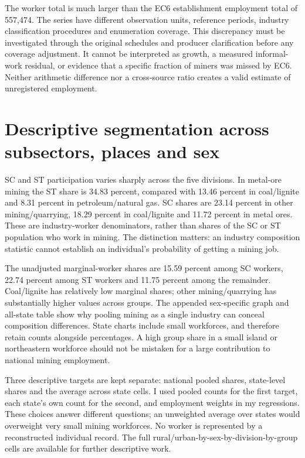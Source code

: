 \documentclass[11pt,a4paper]{report}
\begin{document}
The worker total is much larger than the EC6 establishment employment total of 557,474. The series have different observation units, reference periods, industry classification procedures and enumeration coverage. This discrepancy must be investigated through the original schedules and producer clarification before any coverage adjustment. It cannot be interpreted as growth, a measured informal-work residual, or evidence that a specific fraction of miners was missed by EC6. Neither arithmetic difference nor a cross-source ratio creates a valid estimate of unregistered employment.

\section{Descriptive segmentation across subsectors, places and sex}
SC and ST participation varies sharply across the five divisions. In metal-ore mining the ST share is 34.83 percent, compared with 13.46 percent in coal/\allowbreak{}lignite and 8.31 percent in petroleum/\allowbreak{}natural gas. SC shares are 23.14 percent in other mining/\allowbreak{}quarrying, 18.29 percent in coal/\allowbreak{}lignite and 11.72 percent in metal ores. These are industry-worker denominators, rather than shares of the SC or ST population who work in mining. The distinction matters: an industry composition statistic cannot establish an individual's probability of getting a mining job.

The unadjusted marginal-worker shares are 15.59 percent among SC workers, 22.74 percent among ST workers and 11.75 percent among the remainder. Coal/\allowbreak{}lignite has relatively low marginal shares; other mining/\allowbreak{}quarrying has substantially higher values across groups. The appended sex-specific graph and all-state table show why pooling mining as a single industry can conceal composition differences. State charts include small workforces, and therefore retain counts alongside percentages. A high group share in a small island or northeastern workforce should not be mistaken for a large contribution to national mining employment.

Three descriptive targets are kept separate: national pooled shares, state-level shares and the average across state cells. I used pooled counts for the first target, each state's own count for the second, and employment weights in my regressions. These choices answer different questions; an unweighted average over states would overweight very small mining workforces. No worker is represented by a reconstructed individual record. The full rural/\allowbreak{}urban-by-sex-by-division-by-group cells are available for further descriptive work.
\end{document}
